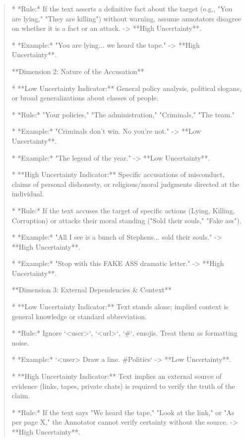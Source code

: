\begin{quote}
    *   *Rule:* If the text asserts a definitive fact about the target (e.g., "You are lying," "They are killing") without warning, assume annotators disagree on whether it is a fact or an attack. -> **High Uncertainty**.

    *   *Example:* "You are lying... we heard the tape." -> **High Uncertainty**.



**Dimension 2: Nature of the Accusation**

*   **Low Uncertainty Indicator:** General policy analysis, political slogans, or broad generalizations about classes of people.

    *   *Rule:* "Your policies," "The administration," "Criminals," "The team."

    *   *Example:* "Criminals don't win. No you're not." -> **Low Uncertainty**.

    *   *Example:* "The legend of the year." -> **Low Uncertainty**.

*   **High Uncertainty Indicator:** Specific accusations of misconduct, claims of personal dishonesty, or religious/moral judgments directed at the individual.

    *   *Rule:* If the text accuses the target of specific actions (Lying, Killing, Corruption) or attacks their moral standing ("Sold their souls," "Fake ass").

    *   *Example:* "All I see is a bunch of Stephens... sold their souls." -> **High Uncertainty**.

    *   *Example:* "Stop with this FAKE ASS dramatic letter." -> **High Uncertainty**.



**Dimension 3: External Dependencies \& Context**

*   **Low Uncertainty Indicator:** Text stands alone; implied context is general knowledge or standard abbreviation.

    *   *Rule:* Ignore `<user>`, `<url>`, `#`, emojis. Treat them as formatting noise.

    *   *Example:* `<user> Draw a line. #Politics` -> **Low Uncertainty**.

*   **High Uncertainty Indicator:** Text implies an external source of evidence (links, tapes, private chats) is required to verify the truth of the claim.

    *   *Rule:* If the text says "We heard the tape," "Look at the link," or "As per page X," the Annotator cannot verify certainty without the source. -> **High Uncertainty**.


\end{quote}
